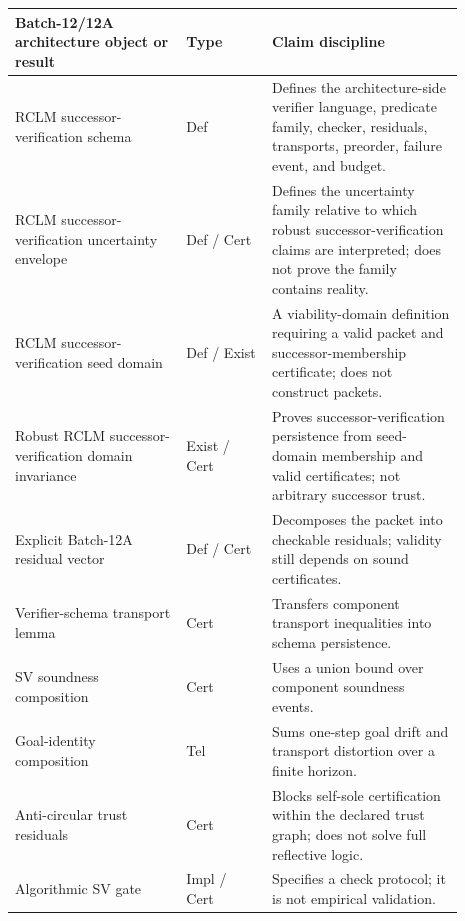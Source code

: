 \documentclass[11pt,a4paper]{article}
\begin{document}
\begin{longtable}{p{0.34\linewidth}p{0.17\linewidth}p{0.38\linewidth}}
\toprule
\textbf{Batch-12/12A architecture object or result} & \textbf{Type} & \textbf{Claim discipline}\\
\midrule
\endhead
\bottomrule
\endlastfoot
RCLM successor-verification schema & Def & Defines the architecture-side verifier language, predicate family, checker, residuals, transports, preorder, failure event, and budget.\\
RCLM successor-verification uncertainty envelope & Def / Cert & Defines the uncertainty family relative to which robust successor-verification claims are interpreted; does not prove the family contains reality.\\
RCLM successor-verification seed domain & Def / Exist & A viability-domain definition requiring a valid packet and successor-membership certificate; does not construct packets.\\
Robust RCLM successor-verification domain invariance & Exist / Cert & Proves successor-verification persistence from seed-domain membership and valid certificates; not arbitrary successor trust.\\
Explicit Batch-12A residual vector & Def / Cert & Decomposes the packet into checkable residuals; validity still depends on sound certificates.\\
Verifier-schema transport lemma & Cert & Transfers component transport inequalities into schema persistence.\\
SV soundness composition & Cert & Uses a union bound over component soundness events.\\
Goal-identity composition & Tel & Sums one-step goal drift and transport distortion over a finite horizon.\\
Anti-circular trust residuals & Cert & Blocks self-sole certification within the declared trust graph; does not solve full reflective logic.\\
Algorithmic SV gate & Impl / Cert & Specifies a check protocol; it is not empirical validation.\\
\end{longtable}
\end{document}
